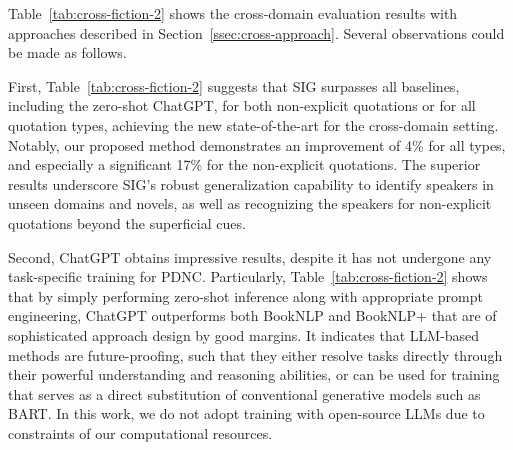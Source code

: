 \documentclass[letterpaper]{article} %
\begin{document}
Table~\ref{tab:cross-fiction-2} shows the cross-domain evaluation results with approaches described in Section~\ref{ssec:cross-approach}.
Several observations could be made as follows.

First, Table~\ref{tab:cross-fiction-2} suggests that SIG surpasses all baselines, including the zero-shot ChatGPT, for both non-explicit quotations or for all quotation types, achieving the new state-of-the-art for the cross-domain setting.  Notably, our proposed method demonstrates an improvement of 4\% for all types, and especially a significant 17\% for the non-explicit quotations.
The superior results underscore SIG's robust generalization capability to identify speakers in unseen domains and novels, as well as recognizing the speakers for non-explicit quotations beyond the superficial cues. 

Second, ChatGPT obtains impressive results, despite it has not undergone any task-specific training for PDNC. Particularly, Table~\ref{tab:cross-fiction-2} shows that by simply performing zero-shot inference along with appropriate prompt engineering, ChatGPT outperforms both BookNLP and BookNLP+ that are of sophisticated approach design by good margins. It indicates that LLM-based methods are future-proofing, such that they either resolve tasks directly through their powerful understanding and reasoning abilities, or can be used for training that serves as a direct substitution of conventional generative models such as BART. In this work, we do not adopt training with open-source LLMs due to constraints of our computational resources.

\end{document}
